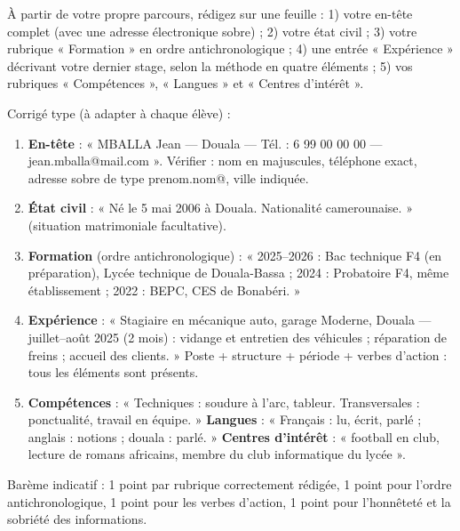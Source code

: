 \documentclass[11pt]{article}
\begin{document}
\begin{exercice}
À partir de votre propre parcours, rédigez sur une feuille : 1) votre en-tête complet (avec une adresse électronique sobre) ; 2) votre état civil ; 3) votre rubrique « Formation » en ordre antichronologique ; 4) une entrée « Expérience » décrivant votre dernier stage, selon la méthode en quatre éléments ; 5) vos rubriques « Compétences », « Langues » et « Centres d'intérêt ».
\end{exercice}

\begin{corrige}
Corrigé type (à adapter à chaque élève) :
\begin{enumerate}
\item \textbf{En-tête} : « MBALLA Jean — Douala — Tél. : 6 99 00 00 00 — jean.mballa@mail.com ». Vérifier : nom en majuscules, téléphone exact, adresse sobre de type prenom.nom@, ville indiquée.
\item \textbf{État civil} : « Né le 5 mai 2006 à Douala. Nationalité camerounaise. » (situation matrimoniale facultative).
\item \textbf{Formation} (ordre antichronologique) : « 2025--2026 : Bac technique F4 (en préparation), Lycée technique de Douala-Bassa ; 2024 : Probatoire F4, même établissement ; 2022 : BEPC, CES de Bonabéri. »
\item \textbf{Expérience} : « Stagiaire en mécanique auto, garage Moderne, Douala — juillet--août 2025 (2 mois) : vidange et entretien des véhicules ; réparation de freins ; accueil des clients. » Poste + structure + période + verbes d'action : tous les éléments sont présents.
\item \textbf{Compétences} : « Techniques : soudure à l'arc, tableur. Transversales : ponctualité, travail en équipe. » \textbf{Langues} : « Français : lu, écrit, parlé ; anglais : notions ; douala : parlé. » \textbf{Centres d'intérêt} : « football en club, lecture de romans africains, membre du club informatique du lycée ».
\end{enumerate}
Barème indicatif : 1 point par rubrique correctement rédigée, 1 point pour l'ordre antichronologique, 1 point pour les verbes d'action, 1 point pour l'honnêteté et la sobriété des informations.
\end{corrige}
\end{document}
